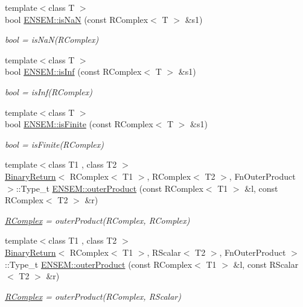 \begin{DoxyCompactItemize}
{\footnotesize template$<$class T $>$ }\\bool \mbox{\hyperlink{group__rcomplex_ga909986b087edfa0819ffe4b76d00ed42}{E\+N\+S\+E\+M\+::is\+NaN}} (const R\+Complex$<$ T $>$ \&s1)
\begin{DoxyCompactList}\small\item\em bool = is\+Na\+N(\+R\+Complex) \end{DoxyCompactList}\item 
{\footnotesize template$<$class T $>$ }\\bool \mbox{\hyperlink{group__rcomplex_gabf9e4d305784028c682bdf06201dba86}{E\+N\+S\+E\+M\+::is\+Inf}} (const R\+Complex$<$ T $>$ \&s1)
\begin{DoxyCompactList}\small\item\em bool = is\+Inf(\+R\+Complex) \end{DoxyCompactList}\item 
{\footnotesize template$<$class T $>$ }\\bool \mbox{\hyperlink{group__rcomplex_ga3152e73aedd89eafdfab17e0cb0363b5}{E\+N\+S\+E\+M\+::is\+Finite}} (const R\+Complex$<$ T $>$ \&s1)
\begin{DoxyCompactList}\small\item\em bool = is\+Finite(\+R\+Complex) \end{DoxyCompactList}\item 
{\footnotesize template$<$class T1 , class T2 $>$ }\\\mbox{\hyperlink{structBinaryReturn}{Binary\+Return}}$<$ R\+Complex$<$ T1 $>$, R\+Complex$<$ T2 $>$, Fn\+Outer\+Product $>$\+::Type\+\_\+t \mbox{\hyperlink{group__rcomplex_gaf9789ce4e93ec3781ea59cb4f44afe38}{E\+N\+S\+E\+M\+::outer\+Product}} (const R\+Complex$<$ T1 $>$ \&l, const R\+Complex$<$ T2 $>$ \&r)
\begin{DoxyCompactList}\small\item\em \mbox{\hyperlink{classENSEM_1_1RComplex}{R\+Complex}} = outer\+Product(\+R\+Complex, R\+Complex) \end{DoxyCompactList}\item 
{\footnotesize template$<$class T1 , class T2 $>$ }\\\mbox{\hyperlink{structBinaryReturn}{Binary\+Return}}$<$ R\+Complex$<$ T1 $>$, R\+Scalar$<$ T2 $>$, Fn\+Outer\+Product $>$\+::Type\+\_\+t \mbox{\hyperlink{group__rcomplex_ga3452d86b3ff7fc9db6565959c2f896db}{E\+N\+S\+E\+M\+::outer\+Product}} (const R\+Complex$<$ T1 $>$ \&l, const R\+Scalar$<$ T2 $>$ \&r)
\begin{DoxyCompactList}\small\item\em \mbox{\hyperlink{classENSEM_1_1RComplex}{R\+Complex}} = outer\+Product(\+R\+Complex, R\+Scalar) \end{DoxyCompactList}\item 

\end{DoxyCompactItemize}
